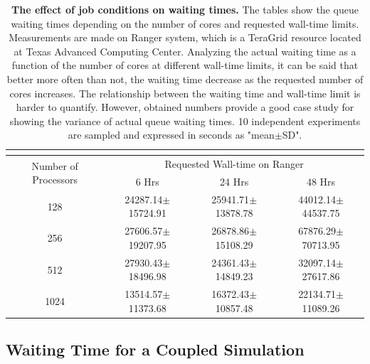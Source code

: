 \documentclass[preprint,12pt]{elsarticle}
\begin{document}
\begin{table}
  \caption{\small {\bf The effect of job conditions on waiting times.}
The tables show the queue waiting times 
depending on the number of cores and requested wall-time limits.
Measurements are made on Ranger system,
which is a TeraGrid resource located at Texas Advanced Computing Center.
Analyzing the actual waiting time as a function of 
the number of cores at different wall-time limits, 
it can be said that better more often than not, 
the waiting time decrease as the requested number of cores increases. 
The relationship between the waiting time and wall-time limit is harder 
to quantify. However, obtained numbers provide a good case study 
for showing the variance of actual queue waiting times. 
10 independent experiments are sampled and expressed in seconds as "mean$\pm$SD".}
  \label{table:WaitTime}
  \centering
\footnotesize
  \begin{tabular}{c || c c c}
 \multicolumn{4}{c}{\phantom{\tiny 100}}\\
\hline
 \multirow{2}{0.15\textwidth}{Number of Processors} &
 \multicolumn{3}{c}{Requested Wall-time on Ranger} \\
\cline{2-4}
& 6 Hrs & 24 Hrs & 48 Hrs\\
\hline			
128  &  24287.14\scriptsize{$\pm$15724.91}  &  25941.71\scriptsize{$\pm$13878.78}  &  44012.14\scriptsize{$\pm$44537.75} \\
256  &  27606.57\scriptsize{$\pm$19207.95}  &  26878.86\scriptsize{$\pm$15108.29}  &  67876.29\scriptsize{$\pm$70713.95} \\
512  &  27930.43\scriptsize{$\pm$18496.98}  &  24361.43\scriptsize{$\pm$14849.23}  &  32097.14\scriptsize{$\pm$27617.86} \\
1024  &  13514.57\scriptsize{$\pm$11373.68}  &  16372.43\scriptsize{$\pm$10857.48}  &  22134.71\scriptsize{$\pm$11089.26} \\

\hline
\end{tabular} %
\vspace{-1em}
\end{table}


\subsection{Waiting Time for a Coupled Simulation}
\label{sec:performance_waiting}
\end{document}
